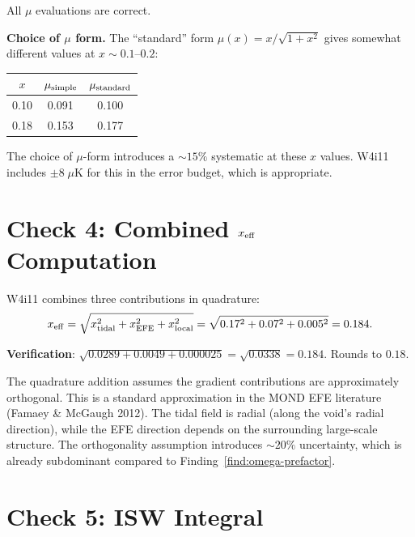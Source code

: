 \documentclass[11pt,a4paper]{article}
\newcommand{\mufd}{\mu}
\begin{document}
All $\mufd$ evaluations are correct.

\textbf{Choice of $\mufd$ form.} The ``standard'' form
$\mufd(x) = x/\sqrt{1+x^2}$ gives somewhat different values at
$x \sim 0.1$--$0.2$:
\begin{center}
\begin{tabular}{ccc}
\toprule
$x$ & $\mufd_{\rm simple}$ & $\mufd_{\rm standard}$ \\
\midrule
0.10 & 0.091 & 0.100 \\
0.18 & 0.153 & 0.177 \\
\bottomrule
\end{tabular}
\end{center}

The choice of $\mufd$-form introduces a $\sim 15\%$ systematic at
these $x$ values. W4i11 includes $\pm 8\;\mu$K for this in the
error budget, which is appropriate.


\section{Check 4: Combined $x_{\rm eff}$ Computation}
\label{sec:check4}

W4i11 combines three contributions in quadrature:
\begin{equation}
x_{\rm eff} = \sqrt{x_{\rm tidal}^2 + x_{\rm EFE}^2 + x_{\rm local}^2}
= \sqrt{0.17^2 + 0.07^2 + 0.005^2} = 0.184.
\end{equation}

\textbf{Verification}: $\sqrt{0.0289 + 0.0049 + 0.000025} = \sqrt{0.0338}
= 0.184$. Rounds to $0.18$. \checkmark

The quadrature addition assumes the gradient contributions are
approximately orthogonal. This is a standard approximation in the
MOND EFE literature (Famaey \& McGaugh 2012). The tidal field is
radial (along the void's radial direction), while the EFE direction
depends on the surrounding large-scale structure. The orthogonality
assumption introduces $\sim 20\%$ uncertainty, which is already
subdominant compared to Finding~\ref{find:omega-prefactor}.


\section{Check 5: ISW Integral}
\label{sec:check5}
\end{document}
